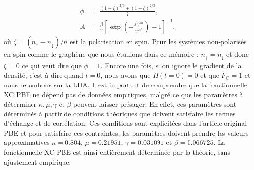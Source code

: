 \begin{align}
    \phi &= \frac{(1+\zeta)^{2/3}+(1-\zeta)^{2/3}}{2},\\
    A &= \frac{\beta}{\gamma}\left[\exp\left(-\frac{\varepsilon_\text{C}^\text{hom}}{\gamma\phi^3}\right)-1\right]^{-1},
\end{align}
où $\zeta=(n_\uparrow-n_\downarrow)/n $ est la polarisation en spin. Pour les systèmes non-polarisés en spin comme le graphène que nous étudions dans ce mémoire : $n_\uparrow = n_\downarrow$ et donc $\zeta=0$ ce qui veut dire que $\phi=1$. Encore une fois, si on ignore le gradient de la densité, c'est-à-dire quand $t=0$, nous avons que $H(t=0)=0$ et que $F_\text{C}=1$ et nous retombons sur la LDA. Il est important de comprendre que la fonctionnelle XC PBE ne dépend pas de données empiriques, malgré ce que les paramètres à déterminer $\kappa, \mu,\gamma$ et $\beta$ peuvent laisser présager. En effet, ces paramètres sont déterminés à partir de conditions théoriques que doivent satisfaire les termes d'échange et de corrélation. Ces conditions sont explicitées dans l'article original PBE \cite{perdewGeneralizedGradientApproximation1996a} et pour satisfaire ces contraintes, les paramètres doivent prendre les valeurs approximatives $\kappa=0.804$, $\mu=0.21951$, $\gamma=0.031091$ et $\beta=0.066725$. La fonctionnelle XC PBE est ainsi entièrement déterminée par la théorie, sans ajustement empirique.